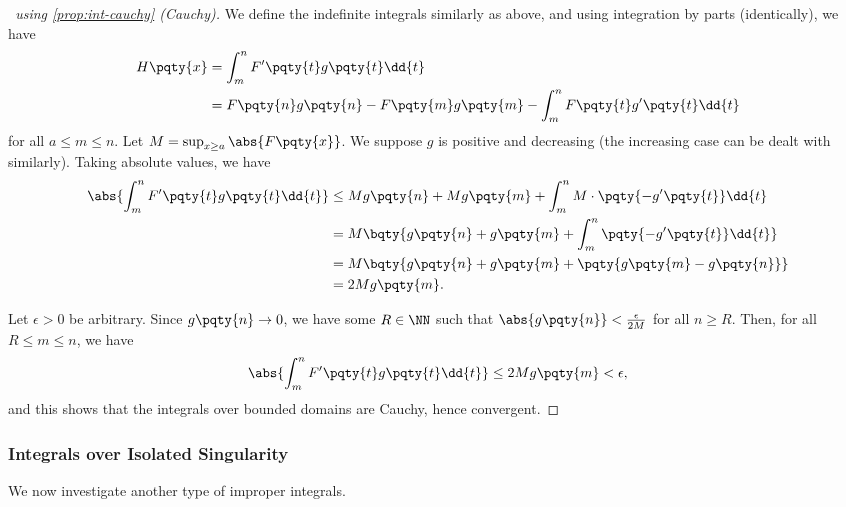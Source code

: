 \begin{proof}[\proofname\ using \autoref{prop:int-cauchy} (Cauchy)]
    We define the indefinite integrals similarly as above, and using integration by parts (identically), we have
    \begin{align*}
        H\pqty{x} &= \int_{m}^{n} F'\pqty{t} g\pqty{t} \dd{t} \\
        &= F\pqty{n} g\pqty{n} - F\pqty{m} g\pqty{m} - \int_{m}^{n} F\pqty{t} g'\pqty{t} \dd{t}
    \end{align*}
    for all \(a \leq m \leq n\). Let \(M = \sup_{x \geq a} \abs{F\pqty{x}}\). We suppose \(g\) is positive and decreasing (the increasing case can be dealt with similarly). Taking absolute values, we have
    \begin{align*}
        \abs{\int_{m}^{n} F'\pqty{t} g\pqty{t} \dd{t}} &\leq M g\pqty{n} + M g\pqty{m} + \int_{m}^{n} M \cdot \pqty{- g'\pqty{t}} \dd{t} \\
        &= M \bqty{g\pqty{n} + g\pqty{m} + \int_{m}^{n} \pqty{- g'\pqty{t}} \dd{t}} \\
        &= M \bqty{g\pqty{n} + g\pqty{m} + \pqty{g\pqty{m} - g\pqty{n}}} \\
        &= 2 M g\pqty{m}.
    \end{align*}

    Let \(\epsilon > 0\) be arbitrary. Since \(g\pqty{n} \to 0\), we have some \(R \in \NN\) such that \(\abs{g\pqty{n}} < \frac{\epsilon}{2M}\) for all \(n \geq R\). Then, for all \(R \leq m \leq n\), we have
    \[
        \abs{\int_{m}^{n} F'\pqty{t} g\pqty{t} \dd{t}} \leq 2M g\pqty{m} < \epsilon,
    \]
    and this shows that the integrals over bounded domains are Cauchy, hence convergent.
\end{proof}

\subsubsection{Integrals over Isolated Singularity}

We now investigate another type of improper integrals.

